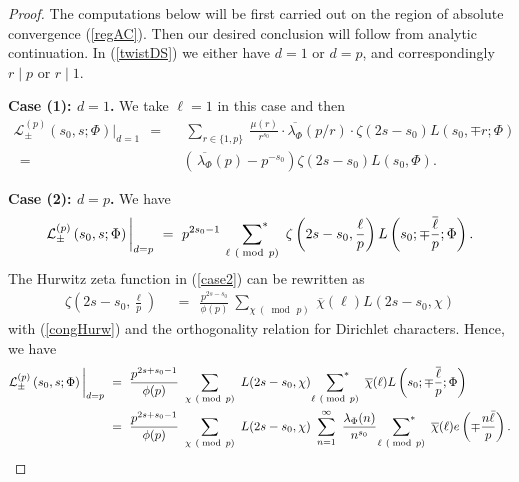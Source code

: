 \documentclass[11pt,reqno]{amsart}
\theoremstyle{definition}
\theoremstyle{definition}
\theoremstyle{remark}
\numberwithin{equation}{section}
\begin{document}
\begin{proof}
	The computations below will be first  carried out on the region of absolute convergence (\ref{regAC}). Then  our desired conclusion will follow from analytic continuation.  In  (\ref{twistDS})  we either have $d=1$ or $d=p$,  and  correspondingly   $r\mid p$ or $r\mid 1$. 
	
	
	\noindent \textbf{Case (1): $d=1$. }  We take $\ell=1$ in this case and then 
	\begin{align*}
		\mathcal{L}^{(p)}_{\pm}\left(s_{0}, s; \Phi \right) \bigg|_{d=1} \ \ = \ \  	&\ \sum_{r\in \{1,p\}} \ \frac{\mu(r)}{r^{s_{0}}}\cdot   \overline{\lambda_{\Phi}}(p/r) \cdot \zeta(2s-s_{0}) L\left(s_{0}, \mp r; \Phi\right) \nonumber\\
		\ \ =  \ \ &  \left( \,  \overline{\lambda_{\Phi}}(p)- p^{-s_{0}}\right) \zeta(2s-s_{0}) L\left(s_{0}, \Phi\right).
	\end{align*}
	
	
	\noindent \textbf{Case (2): $d=p$.} We have
	\begin{align}\label{case2}
		\mathcal{L}^{(p)}_{\pm}\left(s_{0}, s; \Phi\right) \bigg|_{d=p}  \ = \ 	p^{ 2s_{0}-1}  \  \   \sideset{}{^*}{\sum}_{\ell \ (\bmod\, p)} \  \zeta\left( 2s-s_{0}, \frac{\ell}{p}\right) 	L\left( s_{0}; \mp \frac{\overline{\ell}}{p}; \Phi\right). 
	\end{align}
The Hurwitz zeta function in (\ref{case2})   can be rewritten as  
	\begin{align*}
		\zeta\left( 2s-s_{0}, \frac{\ell}{p}\right) \  \ &=  \ \   \frac{p^{2s-s_{0}}}{\phi(p)} \ \sum_{\chi \ (\bmod\, p)} \ \overline{\chi}(\ell) L(2s-s_{0}, \chi)
	\end{align*}
	 with (\ref{congHurw}) and   the orthogonality relation for Dirichlet characters.  Hence, we have
	\begin{align}\label{afterorth}
			\mathcal{L}^{(p)}_{\pm}\left(s_{0}, s; \Phi\right) \bigg|_{d=p}  \ &= \ 	 \frac{p^{2s+s_{0}-1}}{\phi(p)}  \      \sum_{\chi \ (\bmod\, p)} \  L(2s-s_{0}, \chi)  \  \sideset{}{^*}{\sum}_{\ell \ (\bmod\, p)}  \ \overline{\chi}(\ell) L\left( s_{0}; \mp \frac{\overline{\ell}}{p}; \Phi\right) \nonumber\\
			\ &=\   	 \frac{p^{2s+s_{0}-1}}{\phi(p)}  \      \sum_{\chi \ (\bmod\, p)} \  L(2s-s_{0}, \chi)  \ \sum_{n=1}^{\infty} \ \frac{\lambda_{\Phi}(n)}{n^{s_{0}}} \  \sideset{}{^*}{\sum}_{\ell \ (\bmod\, p)}  \ \overline{\chi}(\ell) 	e\left(\mp \frac{n\bar{\ell}}{p}\right).
	\end{align}
	

\end{proof}
\end{document}
